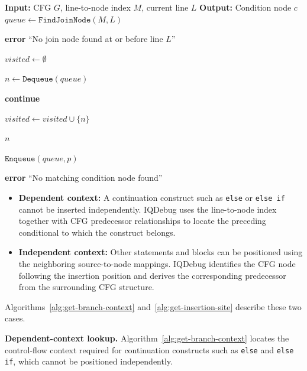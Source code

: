 \documentclass[11pt,oneside]{report}
\theoremstyle{plain}
\theoremstyle{definition}
\theoremstyle{remark}
\begin{document}
\begin{algorithm}[!t]
\caption{Dependent-Context Lookup}
\label{alg:get-branch-context}
\begin{algorithmic}[1]
\State \textbf{Input:} CFG $G$, line-to-node index $M$, current line $L$
\State \textbf{Output:} Condition node $c$
\State $queue \gets \texttt{FindJoinNode}(M, L)$

\State \textbf{error} ``No join node found at or before line $L$''
\EndIf

\State $visited \gets \emptyset$

\State $n \gets \texttt{Dequeue}(queue)$

  \State \textbf{continue}
\EndIf

\State $visited \gets visited\cup\{n\}$

  \State \Return $n$
\EndIf

    \State $\texttt{Enqueue}(queue,p)$
  \EndIf
\EndFor

\EndWhile

\State \textbf{error} ``No matching condition node found''
\EndFunction
\end{algorithmic}
\end{algorithm}

\begin{itemize}
  \item \textbf{Dependent context:} A continuation construct such as \texttt{else} or \texttt{else if} cannot be inserted independently. IQDebug uses the line-to-node index together with CFG predecessor relationships to locate the preceding conditional to which the construct belongs.

  \item \textbf{Independent context:} Other statements and blocks can be positioned using the neighboring source-to-node mappings. IQDebug identifies the CFG node following the insertion position and derives the corresponding predecessor from the surrounding CFG structure.
\end{itemize}

Algorithms~\ref{alg:get-branch-context} and~\ref{alg:get-insertion-site} describe these two cases.

\noindent\textbf{Dependent-context lookup.}
Algorithm~\ref{alg:get-branch-context} locates the control-flow context required for continuation constructs such as \texttt{else} and \texttt{else if}, which cannot be positioned independently.
\end{document}
